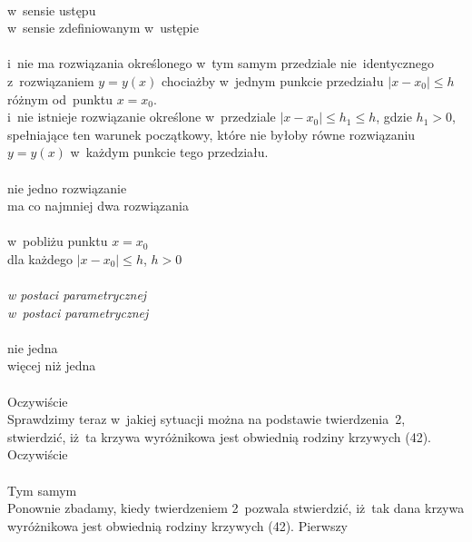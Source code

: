 \documentclass[a4paper,11pt]{article}
\numberwithin{equation}{section}
\begin{document}
\noindent
{} \\
\Jest  w~sensie ustępu \\
\Powin w~sensie zdefiniowanym w~ustępie \\
 \\
\Jest  i~nie ma rozwiązania określonego w~tym samym przedziale
nie~identycznego z~rozwiązaniem $y = y( x )$ chociażby w~jednym
punkcie przedziału $| x - x_{ 0 } | \leq h$ różnym od~punktu $x = x_{ 0 }$. \\
\Powin i~nie istnieje rozwiązanie określone w~przedziale
$| x - x_{ 0 } | \leq h_{ 1 } \leq h$, gdzie $h_{ 1 } > 0$, spełniające ten warunek
początkowy, które nie byłoby równe rozwiązaniu $y = y( x )$ w~każdym
punkcie tego przedziału. \\
 \\
\Jest  nie jedno rozwiązanie \\
\Powin ma co najmniej dwa rozwiązania \\
 \\
\Jest  w~pobliżu punktu $x = x_{ 0 }$ \\
\Powin dla każdego $| x - x_{ 0 } | \leq h$, $h > 0$ \\
 \\
\Jest  \textit{w \hspace{0.5em} postaci \hspace{0.5em} parametrycznej} \\
\Powin \textit{w~postaci parametrycznej} \\
 \\
\Jest  nie jedna \\
\Powin więcej niż jedna \\
 \\
\Jest  Oczywiście \\
\Powin Sprawdzimy teraz w~jakiej sytuacji można na podstawie twierdzenia~2,
stwierdzić, iż~ta krzywa wyróżnikowa jest obwiednią rodziny krzywych (42).
Oczywiście \\
 \\
\Jest  Tym samym \\
\Powin Ponownie zbadamy, kiedy twierdzeniem 2~pozwala stwierdzić,
iż~tak dana krzywa wyróżnikowa jest obwiednią rodziny krzywych (42).
Pierwszy \\



























{}






\end{document}
